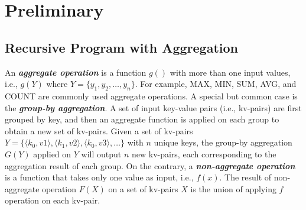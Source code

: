\section{Preliminary}
\label{sec:async}

\subsection{Recursive Program with Aggregation}

 An \emph{\textbf{aggregate operation}} is a function $g()$ with more than one input values, i.e., $g(Y)$ where $Y=\{y_1, y_2, \ldots, y_n\}$. For example, MAX, MIN, SUM, AVG, and COUNT are commonly used aggregate operations. A special but common case is the \emph{\textbf{group-by aggregation}}. A set of input key-value pairs (i.e., kv-pairs) are first grouped by key, and then an aggregate function is applied on each group to obtain a new set of kv-pairs. Given a set of kv-pairs $Y=\{\langle k_0,v1\rangle,\langle k_1,v2\rangle,\langle k_0,v3\rangle,\ldots\}$ with $n$ unique keys, the group-by aggregation $G(Y)$ applied on $Y$ will output $n$ new kv-pairs, each corresponding to the aggregation result of each group. On the contrary, a \emph{\textbf{non-aggregate operation}} is a function that takes only one value as input, i.e., $f(x)$. The result of non-aggregate operation $F(X)$ on a set of kv-pairs $X$ is the union of applying $f$ operation on each kv-pair.

